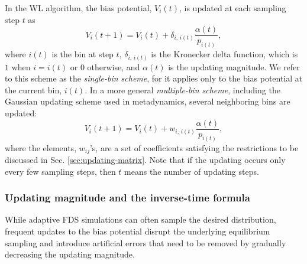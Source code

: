\documentclass[reprint, superscriptaddress, floatfix]{revtex4-1}
\begin{document}
%
In the WL algorithm\cite{wang2001, *wang2001pre},
the bias potential, $V_i(t)$, is updated
at each sampling step $t$ as
%
\begin{equation}
  V_i(t+1)
  =
  V_i(t)
  +
  \delta_{i, \, i(t)}
  \frac{ \alpha(t) } { p_{i(t)} }
  ,
\label{eq:wl_update}
\end{equation}
%
where $i(t)$ is the bin at step $t$,
$\delta_{i, \, i(t)}$ is the Kronecker delta function,
which is $1$ when $i = i(t)$ or $0$ otherwise,
and $\alpha(t)$ is the updating magnitude.
%
We refer to this scheme as the \emph{single-bin scheme},
for it applies only to the bias potential
at the current bin, $i(t)$.
%
In a more general \emph{multiple-bin scheme},
including the Gaussian updating scheme
used in metadynamics,
several neighboring bins are updated:
%
\begin{equation}
  V_i(t+1)
  =
  V_i(t)
  +
  w_{i, \, i(t)}
  \frac{ \alpha(t) }
       { p_{i(t)} },
  \label{eq:mbin_update}
\end{equation}
%
where the elements, $w_{ij}$'s, are a set of coefficients satisfying
the restrictions to be discussed
in Sec. \ref{sec:updating-matrix}.
%
Note that if the updating occurs
only every few sampling steps,
then $t$ means the number of updating steps.



\subsubsection{Updating magnitude and the inverse-time formula}



While adaptive FDS simulations
can often sample the desired distribution,
frequent updates to the bias potential
disrupt the underlying equilibrium sampling
and introduce artificial errors that need to be
removed by gradually decreasing the updating magnitude\cite{
  belardinelli2007, *belardinelli2007jcp, *belardinelli2008, *belardinelli2016,
  zhou2005, morozov2007, zhou2008,
  laio2005, bussi2006, poulain2006, liang2007,
  crespo2010, *atchade2011, *fort2015}.
%
\end{document}
